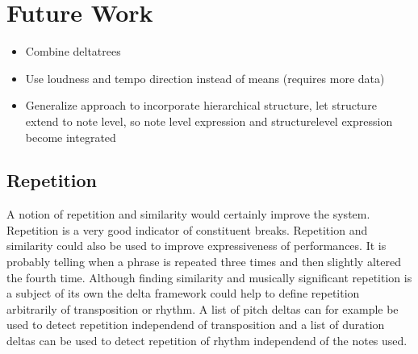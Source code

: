 \documentclass[a4paper,10pt]{article}
\begin{document}
\section{Future Work}
\begin{itemize}
\item Combine deltatrees
\item Use loudness and tempo direction instead of means (requires more data)
\item Generalize approach to incorporate hierarchical structure, let structure extend to note level, so note level expression and structurelevel expression become integrated
\end{itemize}
\subsection{Repetition}
A notion of repetition and similarity would certainly improve the system. Repetition is a very good indicator of constituent breaks. Repetition and similarity could also be used to improve expressiveness of performances. It is probably telling when a phrase is repeated three times and then slightly altered the fourth time. Although finding similarity and musically significant repetition is a subject of its own the delta framework could help to define repetition arbitrarily of transposition or rhythm. A list of pitch deltas can for example be used to detect repetition independend of transposition and a list of duration deltas can be used to detect repetition of rhythm independend of the notes used. 

  
 
 
\end{document}
